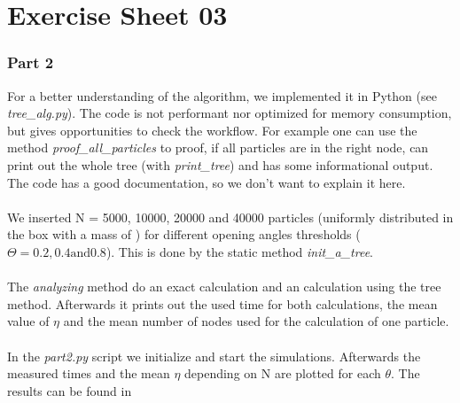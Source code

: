 \documentclass{scrartcl}
\begin{document}
	
	\part*{Exercise Sheet 03}	
	\section*{Part 2}
	For a better understanding of the algorithm, we implemented it in Python (see \emph{tree_alg.py}). The code is not performant nor optimized for memory consumption, but gives opportunities to check the workflow. For example one can use the method \emph{proof_all_particles} to proof, if all particles are in the right node, can print out the whole tree (with \emph{print_tree}) and has some informational output. The code has a good documentation, so we don't want to explain it here.\\
	\\
	We inserted N = 5000, 10000, 20000 and 40000 particles (uniformly distributed in the box with a mass of ) for different opening angles thresholds ($\Theta = 0.2, 0.4 \text{and} 0.8$). This is done by the static method \emph{init_a_tree}.\\
	\\
	The \emph{analyzing} method do an exact calculation and an calculation using the tree method. Afterwards it prints out the used time for both calculations, the mean value of $\eta$ and the mean number of nodes used for the calculation of one particle.\\
	\\
	In the \emph{part2.py} script we initialize and start the simulations. Afterwards the measured times and the mean $\eta$ depending on N are plotted for each $\theta$. The results can be found in %
	
	
\end{document}
